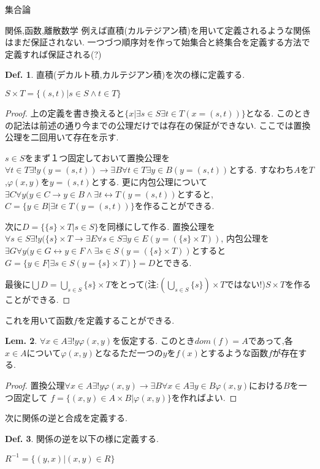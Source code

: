 \documentclass[14pt]{jsarticle}
\theoremstyle{definition}
\newtheorem{dfn}{Def.}[subsection]
\newtheorem{lem}[dfn]{Lem.}
\begin{document}
\begin{section}{集合論}
\begin{subsection}{関係,函数,離散数学}
例えば直積(カルテジアン積)を用いて定義されるような関係はまだ保証されない.
一つづつ順序対を作って始集合と終集合を定義する方法で定義すれば保証される(?)\par
\begin{dfn}
\label{cartesindef}
直積(デカルト積,カルテジアン積)を次の様に定義する.\par
$S \times T = \{(s,t)|s \in S\land t \in T\}$
\end{dfn}
\begin{proof}
上の定義を書き換えると$\{x|\exists s \in S\exists t \in T(x=(s,t))\}$となる.
このときの記法は前述の通り今までの公理だけでは存在の保証ができない.
ここでは置換公理を二回用いて存在を示す.\par
$s\in S$をまず１つ固定しておいて置換公理を$\forall t \in T\exists ! y (y=(s,t))\to \exists B \forall t \in T\exists y \in B (y=(s,t))$とする.
すなわち$A$を$T$,$\varphi(x,y)$を$y=(s,t)$とする.
更に内包公理について$\exists C \forall y(y\in C\to y\in B \land \exists t \leftrightarrow T(y=(s,t))$とすると,$C=\{y\in B|\exists t \in T(y=(s,t))\}$を作ることができる.\par
次に$D=\{\{s\}\times T|s \in S\}$を同様にして作る.
置換公理を$\forall s \in S \exists ! y (\{s\}\times T \to \exists E\forall s \in S \exists y \in E(y=(\{s\}\times T))$,
内包公理を$\exists G \forall y(y \in G \leftrightarrow y \in F \land \exists s \in S(y=(\{s\}\times T))$とすると$G=\{y \in F| \exists s \in S(y=\{s\}\times T)\}=D$とできる.\par
最後に$\displaystyle \bigcup D=\bigcup_{s\in S}\{s\} \times T$をとって(注:$\displaystyle (\bigcup_{s \in S} \{s\}) \times T$ではない!)$S\times T$を作ることができる.
\end{proof}
これを用いて函数$f$を定義することができる.
\begin{lem}
\label{funclemma}
$\forall x \in A \exists ! y \varphi(x,y)$を仮定する.
このとき$dom(f)=A$であって,各$x\in A$について$\varphi(x,y)$となるただ一つの$y$を$f(x)$とするような函数$f$が存在する.
\end{lem}
\begin{proof}
置換公理$\forall x\in A\exists ! y\varphi(x,y) \to \exists B \forall x\in A \exists y \in B \varphi(x,y)$における$B$を一つ固定して
$f=\{(x,y)\in A\times B|\varphi(x,y)\}$を作ればよい.
\end{proof}
次に関係の逆と合成を定義する.
\begin{dfn}
\label{reversedef}
関係の逆を以下の様に定義する.\par
$R^{-1}=\{(y,x)|(x,y)\in R\}$
\end{dfn}

\end{subsection}
\end{section}
\end{document}
